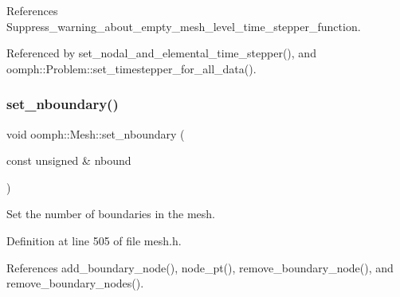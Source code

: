 References Suppress\+\_\+warning\+\_\+about\+\_\+empty\+\_\+mesh\+\_\+level\+\_\+time\+\_\+stepper\+\_\+function.



Referenced by set\+\_\+nodal\+\_\+and\+\_\+elemental\+\_\+time\+\_\+stepper(), and oomph\+::\+Problem\+::set\+\_\+timestepper\+\_\+for\+\_\+all\+\_\+data().

\mbox{\label{classoomph_1_1Mesh_a6667f4ddc6e9357a9a7d53160db8161e}} 
\subsubsection{\texorpdfstring{set\+\_\+nboundary()}{set\_nboundary()}}
{\footnotesize\ttfamily void oomph\+::\+Mesh\+::set\+\_\+nboundary (\begin{DoxyParamCaption}\item[{const unsigned \&}]{nbound }\end{DoxyParamCaption})\hspace{0.3cm}{\ttfamily [inline]}}



Set the number of boundaries in the mesh. 



Definition at line 505 of file mesh.\+h.



References add\+\_\+boundary\+\_\+node(), node\+\_\+pt(), remove\+\_\+boundary\+\_\+node(), and remove\+\_\+boundary\+\_\+nodes().




